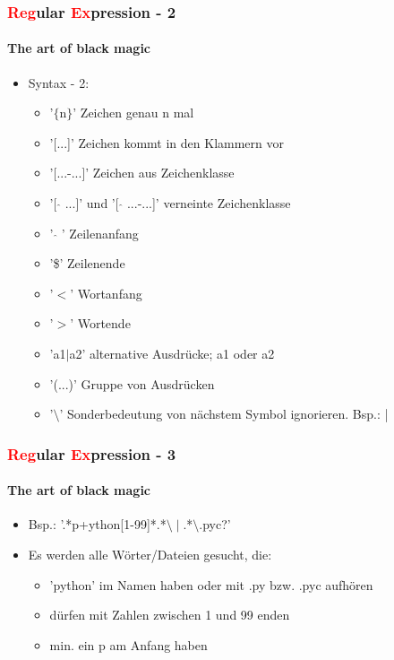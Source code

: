 \documentclass[12pt,utf8, handout]{beamer}
\begin{document}
\begin{frame}
\frametitle{\textcolor{red}{Reg}ular \textcolor{red}{Ex}pression - 2}
\framesubtitle{\textcolor{ownDarkOr}{The art of black magic}}
\begin{itemize}
	\item Syntax - 2:
	\begin{itemize}
		\item {\scriptsize '$\{$n$\}$' Zeichen genau n mal}
		\item {\scriptsize '[...]' Zeichen kommt in den Klammern vor}
		\item {\scriptsize '[...-...]' Zeichen aus Zeichenklasse}
		\item {\scriptsize '[ $\hat{}$ ...]' und '[ $\hat{}$ ...-...]' verneinte Zeichenklasse}
		\item {\scriptsize ' $\hat{}$ ' Zeilenanfang}
		\item {\scriptsize '\$' Zeilenende}
		\item {\scriptsize '$<$' Wortanfang}
		\item {\scriptsize '$>$' Wortende}
		\item {\scriptsize 'a1$\mid$a2' alternative Ausdrücke; a1 oder a2}
		\item {\scriptsize '(...)' Gruppe von Ausdrücken}
		\item {\scriptsize '$\setminus$' Sonderbedeutung von nächstem Symbol ignorieren. Bsp.: |}
	\end{itemize}
\end{itemize}
\end{frame}

\begin{frame}
\frametitle{\textcolor{red}{Reg}ular \textcolor{red}{Ex}pression - 3}
\framesubtitle{\textcolor{ownDarkOr}{The art of black magic}}
\begin{itemize}
	\item Bsp.: '.*p+ython[1-99]*.*$\setminus\mid$.*$\setminus$.pyc?'
	\item Es werden alle Wörter/Dateien gesucht, die:
	\begin{itemize}
		\item 'python' im Namen haben oder mit .py bzw. .pyc aufhören
		\item dürfen mit Zahlen zwischen 1 und 99 enden
		\item min. ein p am Anfang haben
	\end{itemize}
\end{itemize}
\end{frame}
\end{document}
